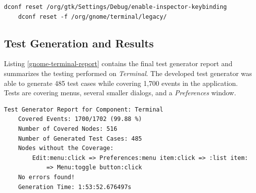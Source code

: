 \begin{lstlisting}[caption={The cleanup commands required to reset GNOME Terminal to its default settings},label={gnome-terminal-cleanup}]
    dconf reset /org/gtk/Settings/Debug/enable-inspector-keybinding
    dconf reset -f /org/gnome/terminal/legacy/
\end{lstlisting}

\subsection*{Test Generation and Results}
Listing \ref{gnome-terminal-report} contains the final test generator report and summarizes the testing performed on \textit{Terminal}. The developed test generator was able to generate 485 test cases while covering 1,700 events in the application. Tests are covering menus, several smaller dialogs, and a \textit{Preferences} window.


\begin{lstlisting}[caption={Final test generator report for GNOME Terminal},label={gnome-terminal-report}]
    Test Generator Report for Component: Terminal
    Covered Events: 1700/1702 (99.88 %)
    Number of Covered Nodes: 516
    Number of Generated Test Cases: 485 
    Nodes without the Coverage:
        Edit:menu:click => Preferences:menu item:click => :list item: 
            => Menu:toggle button:click
    No errors found!
    Generation Time: 1:53:52.676497s
\end{lstlisting}




